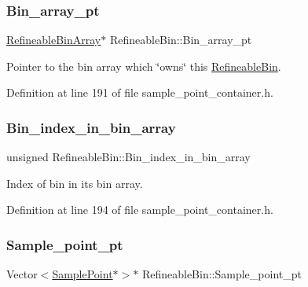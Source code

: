 \subsubsection{\texorpdfstring{Bin\+\_\+array\+\_\+pt}{Bin\_array\_pt}}
{\footnotesize\ttfamily \hyperlink{classRefineableBinArray}{Refineable\+Bin\+Array}$\ast$ Refineable\+Bin\+::\+Bin\+\_\+array\+\_\+pt\hspace{0.3cm}{\ttfamily [protected]}}



Pointer to the bin array which \char`\"{}owns\char`\"{} this \hyperlink{classRefineableBin}{Refineable\+Bin}. 



Definition at line 191 of file sample\+\_\+point\+\_\+container.\+h.

\mbox{\label{classRefineableBin_a7714484b072bdc7466d3d24024588f1f}} 
\subsubsection{\texorpdfstring{Bin\+\_\+index\+\_\+in\+\_\+bin\+\_\+array}{Bin\_index\_in\_bin\_array}}
{\footnotesize\ttfamily unsigned Refineable\+Bin\+::\+Bin\+\_\+index\+\_\+in\+\_\+bin\+\_\+array\hspace{0.3cm}{\ttfamily [protected]}}



Index of bin in its bin array. 



Definition at line 194 of file sample\+\_\+point\+\_\+container.\+h.

\mbox{\label{classRefineableBin_a9d0241fb089b4bb2e50e0ab435ebd6ba}} 
\subsubsection{\texorpdfstring{Sample\+\_\+point\+\_\+pt}{Sample\_point\_pt}}
{\footnotesize\ttfamily Vector$<$\hyperlink{classSamplePoint}{Sample\+Point}$\ast$$>$$\ast$ Refineable\+Bin\+::\+Sample\+\_\+point\+\_\+pt\hspace{0.3cm}{\ttfamily [protected]}}



